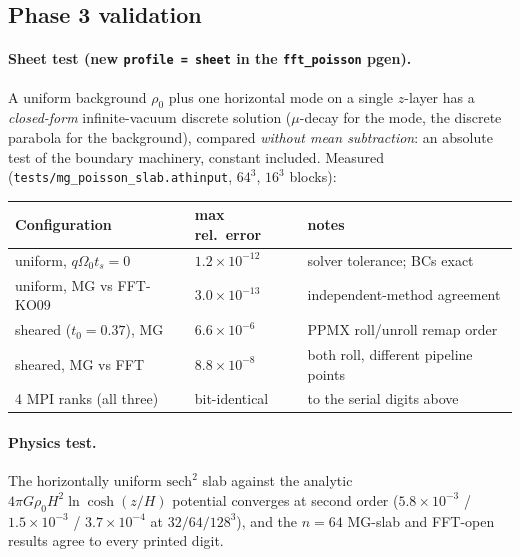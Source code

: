 \documentclass[11pt]{article}
\newcommand{\code}[1]{\texttt{#1}}
\newcommand{\file}[1]{\texttt{\small #1}}
\newcommand{\Om}{\Omega_0}
\begin{document}
\subsection{Phase 3 validation}
\label{sec:phase3val}

\paragraph{Sheet test (new \code{profile\,=\,sheet} in the \code{fft\_poisson}
pgen).} A uniform background $\rho_0$ plus one horizontal mode on a single $z$-layer
has a \emph{closed-form} infinite-vacuum discrete solution ($\mu$-decay for the mode,
the discrete parabola for the background), compared \emph{without mean subtraction}:
an absolute test of the boundary machinery, constant included. Measured
(\file{tests/mg\_poisson\_slab.athinput}, $64^3$, $16^3$ blocks):
\begin{center}
\small
\begin{tabular}{@{}lll@{}}
\toprule
Configuration & max rel.\ error & notes \\
\midrule
uniform, $q\Om t_s = 0$ & $1.2\times10^{-12}$ & solver tolerance; BCs exact \\
uniform, MG vs FFT-KO09 & $3.0\times10^{-13}$ & independent-method agreement \\
sheared ($t_0 = 0.37$), MG & $6.6\times10^{-6}$ & PPMX roll/unroll remap order \\
sheared, MG vs FFT & $8.8\times10^{-8}$ & both roll, different pipeline points \\
4 MPI ranks (all three) & bit-identical & to the serial digits above \\
\bottomrule
\end{tabular}
\end{center}

\paragraph{Physics test.} The horizontally uniform $\mathrm{sech}^2$ slab against the
analytic $4\pi G\rho_0 H^2\ln\cosh(z/H)$ potential converges at second order
($5.8\times10^{-3}$ / $1.5\times10^{-3}$ / $3.7\times10^{-4}$ at $32/64/128^3$), and
the $n = 64$ MG-slab and FFT-open results agree to every printed digit.
\end{document}
